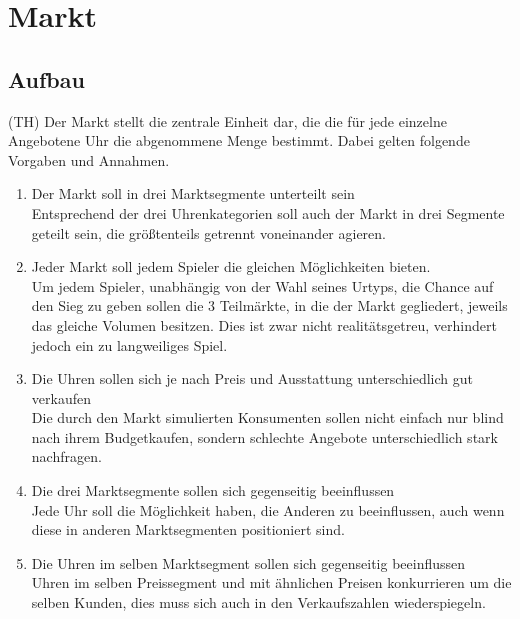 \clearpage
\chapter{Markt} \label{KapitelMarkt}
\section{Aufbau}
(TH) Der Markt stellt die zentrale Einheit dar, die die für jede einzelne Angebotene Uhr die abgenommene Menge bestimmt. Dabei gelten folgende Vorgaben und Annahmen.
\begin{enumerate}
	\item Der Markt soll in drei Marktsegmente unterteilt sein
	\\ Entsprechend der drei Uhrenkategorien soll auch der Markt in drei Segmente geteilt sein, die größtenteils getrennt voneinander agieren.
	\item Jeder Markt soll jedem Spieler die gleichen Möglichkeiten bieten.
	\\ Um jedem Spieler, unabhängig von der Wahl seines Urtyps, die Chance auf den Sieg zu geben sollen die 3 Teilmärkte, in die der Markt gegliedert, jeweils das gleiche Volumen besitzen. Dies ist zwar nicht realitätsgetreu, verhindert jedoch ein zu langweiliges Spiel.
	\item Die Uhren sollen sich je nach Preis und Ausstattung unterschiedlich gut verkaufen
	\\ Die durch den Markt simulierten Konsumenten sollen nicht einfach nur blind nach ihrem Budgetkaufen, sondern schlechte Angebote unterschiedlich stark nachfragen.
	\item Die drei Marktsegmente sollen sich gegenseitig beeinflussen
	\\ Jede Uhr soll die Möglichkeit haben, die Anderen zu beeinflussen, auch wenn diese in anderen Marktsegmenten positioniert sind.
	\item Die Uhren im selben Marktsegment sollen sich gegenseitig beeinflussen
	\\ Uhren im selben Preissegment und mit ähnlichen Preisen konkurrieren um die selben Kunden, dies muss sich auch in den Verkaufszahlen wiederspiegeln.
\end{enumerate}

